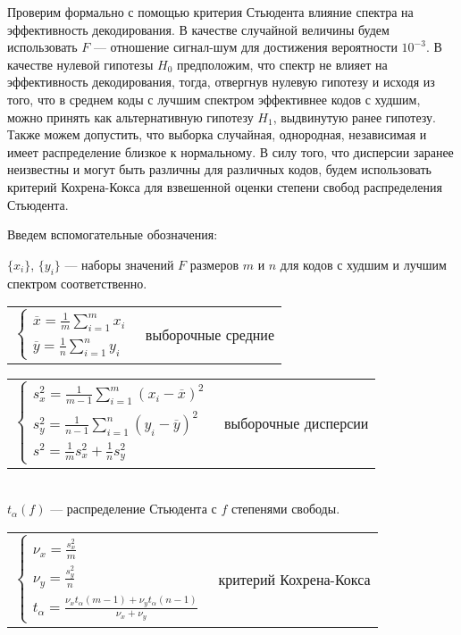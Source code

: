 Проверим формально с помощью критерия Стьюдента влияние спектра на эффективность декодирования.
В качестве случайной величины будем использовать $F$ --- отношение сигнал-шум для достижения вероятности
$10^{-3}$. В качестве нулевой гипотезы $H_0$ предположим, что спектр не влияет на эффективность декодирования, тогда, отвергнув нулевую гипотезу и исходя из того, что в среднем коды с лучшим спектром эффективнее
кодов с худшим, можно принять как альтернативную гипотезу $H_1$, выдвинутую ранее гипотезу. Также
можем допустить, что выборка случайная, однородная, независимая и имеет распределение близкое к нормальному.
В силу того, что дисперсии заранее неизвестны и могут быть различны для различных кодов, будем
использовать критерий Кохрена-Кокса для взвешенной оценки степени свобод распределения Стьюдента.
\pagebreak

Введем вспомогательные обозначения:

$\{x_i\}$, $\{y_i\}$ --- наборы значений $F$ размеров $m$ и $n$ для кодов с худшим и лучшим спектром соответственно.
\\

\begin{tabular}{l c}
$
\begin{cases}
	\overline{x}=\frac{1}{m}\sum_{i=1}^{m}x_i \\
	\overline{y}=\frac{1}{n}\sum_{i=1}^{n}y_i
\end{cases}
$ & выборочные средние
\end{tabular}

\begin{tabular}{l c}
$\begin{cases}
s_x^2=\frac{1}{m-1}\sum_{i=1}^{m}(x_i-\overline{x})^2 \\
s_y^2=\frac{1}{n-1}\sum_{i=1}^{n}(y_i-\overline{y})^2 \\
 s^2=\frac{1}{m}s_x^2+\frac{1}{n}s_y^2
\end{cases}
$ & выборочные дисперсии
\end{tabular}
\\

$t_{\alpha}(f)$ --- распределение Стьюдента с $f$
степенями свободы.
\\

\begin{tabular}{l c}
$\begin{cases}
\nu_x=\frac{s_x^2}{m} \\
\nu_y=\frac{s_y^2}{n} \\
 t_{\alpha}=\frac{\nu_x t_{\alpha}(m-1)+\nu_y t_{\alpha}(n-1)}{\nu_x+\nu_y}
\end{cases}
$ & критерий Кохрена-Кокса
\end{tabular}
\\

